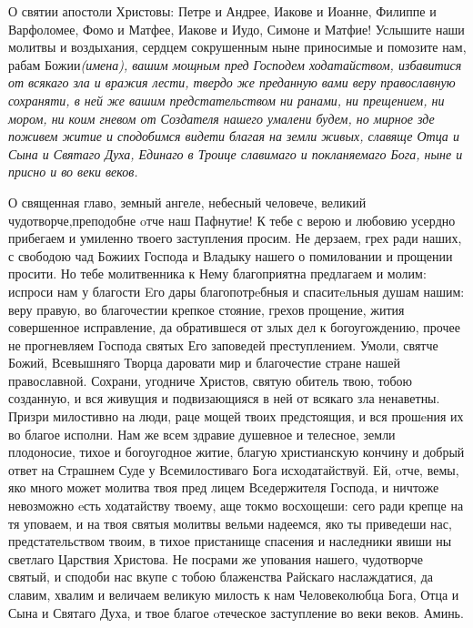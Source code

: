 


 

 



 О святии апостоли Христовы: Петре и  Андрее, Иакове и Иоанне, Филиппе и Варфоломее, Фомо и Матфее, Иакове и Иудо, Симоне и Матфие! Услышите наши молитвы и воздыхания, сердцем сокрушенным  ныне приносимые и помозите нам, рабам Божии\itshape  (имена\normalfont{}), вашим мощным пред Господем ходатайством, избавитися от всякаго зла и вражия лести, твердо же преданную вами веру православную сохраняти, в ней же вашим предстательством ни ранами, ни прещением, ни мором, ни коим гневом  от Создателя нашего умалени будем, но мирное зде поживем житие и сподобимся видети благая на земли живых, славяще Отца и Сына и Святаго Духа, Единаго в Троице славимаго и покланяемаго Бога, ныне и присно и во веки веков.



\bigskip\bigskip\mychapterending

 



О священная главо, земный ангеле, небесный человече, великий чудотворче,преподобне oтче наш Пафнутие! К тебе с верою и любовию усердно прибегаем и умиленно твоего заступления просим. Не дерзаем, грех ради наших, с свободою чад Божиих Господа и Владыку нашего о помиловании и прощении просити. Но тебе молитвенника к Нему благоприятна предлагаем и молим: испроси нам у благости Eго дары благопотрeбныя и спаситeльныя душам нашим: веру правую, во благочестии крепкое стояние, грехов прощение, жития совершенное исправление, да обратившеся от злых дел к богоугождению, прочее не прогневляем Господа святых Его заповедей преступлением. Умоли, святче Божий, Всевышняго Творца даровати мир и благочестие стране нашей православной. Сохрани, угодниче Христов, святую обитель твою, тобою созданную, и вся живущия и подвизающияся в ней от всякаго зла ненаветны. Призри милостивно на люди, раце мощей твоих предстоящия, и вся прошeния их во благое исполни. Нам же всем здравие душевное и телесное, земли плодоносие, тихое и богоугодное житие, благую христианскую кончину и добрый ответ на Страшнем Суде у Всемилостиваго Бога исходатайствуй. Ей, oтче, вемы, яко много может молитва твоя пред лицем Вседержителя Господа, и ничтоже невозможно eсть ходатайству твоему, аще токмо восхощеши: сего ради крепце на тя уповаем, и на твоя святыя молитвы вельми надеемся, яко ты приведеши нас, предстательством твоим, в тихое пристанище спасения и наследники явиши ны светлаго Царствия Христова. Не посрами же упования нашего, чудотворче святый, и сподоби нас вкупе с тобою блаженства Райскаго наслаждатися, да славим, хвалим и величаем великую милость к нам Человеколюбца Бога, Отца и Сына и Святаго Духа, и твое благое oтеческое заступление во веки веков. Аминь.


